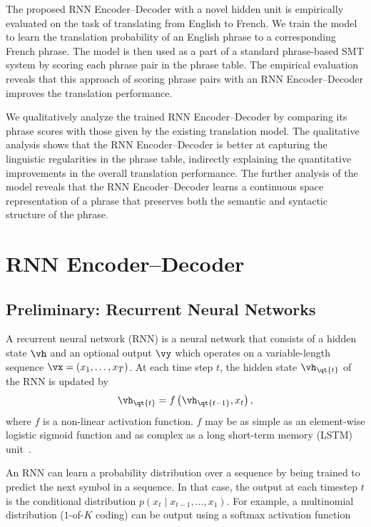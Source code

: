 The proposed RNN Encoder--Decoder with a novel hidden unit is empirically
evaluated on the task of translating from English to French. We train the model
to learn the translation probability of an English phrase to a corresponding
French phrase. The model is then used as a part of a standard phrase-based
SMT system by scoring each phrase pair in the phrase table.
The empirical evaluation reveals that this approach of scoring phrase pairs with
an RNN Encoder--Decoder improves the translation performance.

We qualitatively analyze the trained RNN Encoder--Decoder by comparing its
phrase scores with those given by the existing translation model.  The
qualitative analysis shows that the RNN Encoder--Decoder is better at capturing
the linguistic regularities in the phrase table, indirectly explaining the
quantitative improvements in the overall translation performance.  The further
analysis of the model reveals that the RNN Encoder--Decoder learns a 
continuous space representation of a phrase that preserves both the semantic
and syntactic structure of the phrase.

\section{RNN Encoder--Decoder}

\subsection{Preliminary: Recurrent Neural Networks}
\label{sec:rnn}

A recurrent neural network (RNN) is a neural network that consists of a hidden
state $\vh$ and an optional output $\vy$ which operates on a variable-length
sequence $\vx=(x_1, \dots, x_T)$. At each time step $t$, the hidden state
$\vh_{\qt{t}}$ of the RNN is updated by
\begin{align}
    \label{eq:encoding}
    \vh_{\qt{t}} = f\left( \vh_{\qt{t-1}}, x_t \right),
\end{align}
where $f$ is a non-linear activation function. $f$ may be as simple as an
element-wise logistic sigmoid function and as complex as a long short-term
memory (LSTM) unit~\mbox{\cite{Hochreiter1997}}.

An RNN can learn a probability distribution over a sequence by being trained to
predict the next symbol in a sequence. In that case, the output at each timestep
$t$ is the conditional distribution $p(x_t \mid x_{t-1}, \dots, x_1)$. For example,
a multinomial distribution ($1$-of-$K$ coding) can be output using a softmax
activation function

